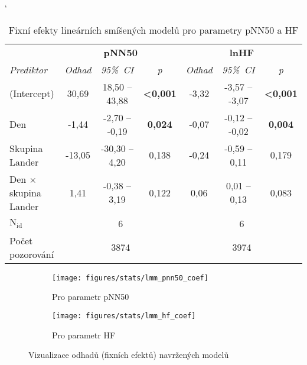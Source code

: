 \begin{table}[h]
    \catcode`
    \footnotesize
    \centering
    \caption{Fixní efekty lineárních smíšených modelů pro parametry pNN50 a HF}
    \begin{threeparttable}
        \begin{tabular*}{\linewidth}{@{\extracolsep{\fill}} lcccccc @{}}
            \toprule
            & \multicolumn{3}{c}{\textbf{pNN50}} & \multicolumn{3}{c}{\textbf{lnHF}}                                                                       \\ \cmidrule(rl){2-4} \cmidrule(rl){5-7}
            \textit{Prediktor}          & \textit{Odhad}                     & \textit{95\%~CI}                       & \textit{p}      & \textit{Odhad} & \textit{95\%~CI}    & \textit{p}      \\ \midrule
            (Intercept)                 & 30,69                              & 18,50 -- 43,88                    & \textbf{<0,001} & -3,32          & -3,57 -- -3,07 & \textbf{<0,001} \\
            Den                         & -1,44                              & -2,70 -- -0,19                    & \textbf{0,024}           & -0,07          & -0,12 -- -0,02 & \textbf{0,004}  \\
            Skupina Lander              & -13,05                             & -30,30 -- 4,20                    & 0,138           & -0,24          & -0,59 -- 0,11  & 0,179           \\
            Den $\times$ skupina Lander & 1,41                               & -0,38 -- 3,19                     & 0,122           & 0,06           & 0,01 -- 0,13   & 0,083           \\ \midrule
            $\mathrm{N}_{\text{id}}$    & \multicolumn{3}{c}{6}              & \multicolumn{3}{c}{6}                                                                                   \\
            Počet pozorování            & \multicolumn{3}{c}{3874}           & \multicolumn{3}{c}{3974}                                                                                \\
            \bottomrule
        \end{tabular*}
    \end{threeparttable}
    \label{tab:lmm_pnn50_hf}
\end{table}

\begin{figure}[!htb]
    \centering
    \begin{subfigure}[h]{0.43\linewidth}
        \texttt{[image: figures/stats/lmm\_pnn50\_coef]}
        \caption{Pro parametr pNN50}
    \end{subfigure}
    \hfill
    \begin{subfigure}[h]{0.43\linewidth}
        \texttt{[image: figures/stats/lmm\_hf\_coef]}
        \caption{Pro parametr HF}
    \end{subfigure}
    \caption{Vizualizace odhadů (fixních efektů) navržených modelů}
    \label{fig:results_lmm_coefs2}
\end{figure}

